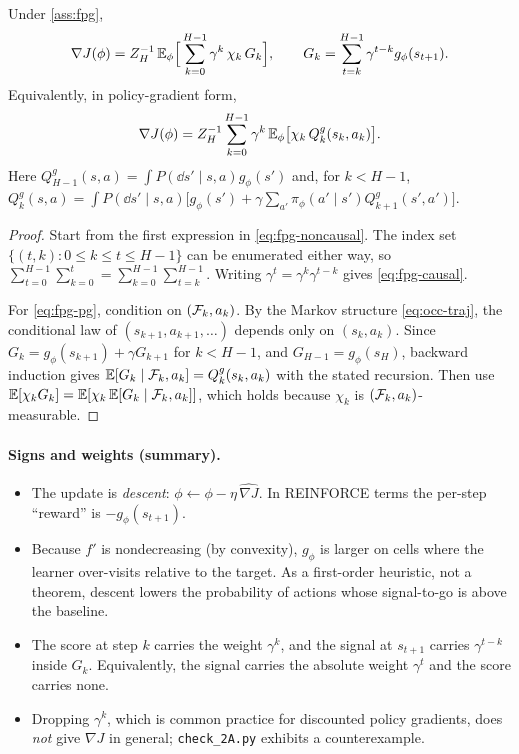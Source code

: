 \begin{theorem}\label{thm:fpg-causal}
Under \cref{ass:fpg},
\begin{equation}\label{eq:fpg-causal}
\nabla J(\phi)=Z_H^{-1}\,\mathbb{E}_\phi\Big[\sum_{k=0}^{H-1}\gamma^k\,\chi_k\,G_k\Big],\qquad
G_k=\sum_{t=k}^{H-1}\gamma^{t-k}g_\phi(s_{t+1}).
\end{equation}
Equivalently, in policy-gradient form,
\begin{equation}\label{eq:fpg-pg}
\nabla J(\phi)=Z_H^{-1}\sum_{k=0}^{H-1}\gamma^k\,\mathbb{E}_\phi\big[\chi_k\,Q^g_k(s_k,a_k)\big].
\end{equation}
Here $Q^g_{H-1}(s,a)=\int P(\dd s'\mid s,a)g_\phi(s')$ and, for $k<H-1$,
$Q^g_k(s,a)=\int P(\dd s'\mid s,a)\big[g_\phi(s')+\gamma\sum_{a'}\pi_\phi(a'\mid s')Q^g_{k+1}(s',a')\big]$.
\end{theorem}
\begin{proof}
Start from the first expression in \eqref{eq:fpg-noncausal}.
The index set $\{(t,k):0\le k\le t\le H-1\}$ can be enumerated either way, so $\sum_{t=0}^{H-1}\sum_{k=0}^t=\sum_{k=0}^{H-1}\sum_{t=k}^{H-1}$.
Writing $\gamma^t=\gamma^k\gamma^{t-k}$ gives \eqref{eq:fpg-causal}.

For \eqref{eq:fpg-pg}, condition on $(\mathcal{F}_k,a_k)$.
By the Markov structure \eqref{eq:occ-traj}, the conditional law of $(s_{k+1},a_{k+1},\dots)$ depends only on $(s_k,a_k)$.
Since $G_k=g_\phi(s_{k+1})+\gamma G_{k+1}$ for $k<H-1$, and $G_{H-1}=g_\phi(s_H)$, backward induction gives $\mathbb{E}[G_k\mid\mathcal{F}_k,a_k]=Q^g_k(s_k,a_k)$ with the stated recursion.
Then use $\mathbb{E}[\chi_kG_k]=\mathbb{E}[\chi_k\,\mathbb{E}[G_k\mid\mathcal{F}_k,a_k]]$, which holds because $\chi_k$ is $(\mathcal{F}_k,a_k)$-measurable.
\end{proof}

\paragraph{Signs and weights (summary).}
\begin{itemize}[nosep]
\item The update is \emph{descent}: $\phi\leftarrow\phi-\eta\,\widehat{\nabla J}$. In REINFORCE terms the per-step ``reward'' is $-g_\phi(s_{t+1})$.
\item Because $f'$ is nondecreasing (by convexity), $g_\phi$ is larger on cells where the learner over-visits relative to the target.
  As a first-order heuristic, not a theorem, descent lowers the probability of actions whose signal-to-go is above the baseline.
\item The score at step $k$ carries the weight $\gamma^k$, and the signal at $s_{t+1}$ carries $\gamma^{t-k}$ inside $G_k$. Equivalently, the signal carries the absolute weight $\gamma^t$ and the score carries none.
\item Dropping $\gamma^k$, which is common practice for discounted policy gradients, does \emph{not} give $\nabla J$ in general; \texttt{check\_2A.py} exhibits a counterexample.
\end{itemize}

